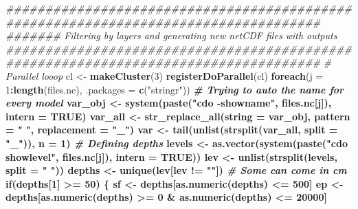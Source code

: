 \documentclass[]{book}
\newenvironment{Shaded}{\begin{snugshade}}{\end{snugshade}}
\newcommand{\CommentTok}[1]{\textcolor[rgb]{0.56,0.35,0.01}{\textit{#1}}}
\newcommand{\ControlFlowTok}[1]{\textcolor[rgb]{0.13,0.29,0.53}{\textbf{#1}}}
\newcommand{\DataTypeTok}[1]{\textcolor[rgb]{0.13,0.29,0.53}{#1}}
\newcommand{\DecValTok}[1]{\textcolor[rgb]{0.00,0.00,0.81}{#1}}
\newcommand{\KeywordTok}[1]{\textcolor[rgb]{0.13,0.29,0.53}{\textbf{#1}}}
\newcommand{\NormalTok}[1]{#1}
\newcommand{\OperatorTok}[1]{\textcolor[rgb]{0.81,0.36,0.00}{\textbf{#1}}}
\newcommand{\OtherTok}[1]{\textcolor[rgb]{0.56,0.35,0.01}{#1}}
\newcommand{\StringTok}[1]{\textcolor[rgb]{0.31,0.60,0.02}{#1}}
\begin{document}
\begin{Shaded}
\begin{Highlighting}[]
{\CommentTok{####################################################################################}
\CommentTok{####### Filtering by layers and generating new netCDF files with outputs}
\CommentTok{#################################################################################### }
  \CommentTok{# Parallel looop}
\NormalTok{    cl <-}\StringTok{ }\KeywordTok{makeCluster}\NormalTok{(}\DecValTok{3}\NormalTok{)}
    \KeywordTok{registerDoParallel}\NormalTok{(cl)}
    \KeywordTok{foreach}\NormalTok{(}\DataTypeTok{j =} \DecValTok{1}\OperatorTok{:}\KeywordTok{length}\NormalTok{(files.nc), }\DataTypeTok{.packages =} \KeywordTok{c}\NormalTok{(}\StringTok{"stringr"}\NormalTok{)) }\OperatorTok{%
      \CommentTok{# Trying to auto the name for every model}
\NormalTok{        var_obj <-}\StringTok{ }\KeywordTok{system}\NormalTok{(}\KeywordTok{paste}\NormalTok{(}\StringTok{"cdo -showname"}\NormalTok{, files.nc[j]), }\DataTypeTok{intern =} \OtherTok{TRUE}\NormalTok{)}
\NormalTok{        var_all <-}\StringTok{ }\KeywordTok{str_replace_all}\NormalTok{(}\DataTypeTok{string =}\NormalTok{ var_obj, }\DataTypeTok{pattern =} \StringTok{" "}\NormalTok{, }\DataTypeTok{replacement =} \StringTok{"_"}\NormalTok{)}
\NormalTok{        var <-}\StringTok{ }\KeywordTok{tail}\NormalTok{(}\KeywordTok{unlist}\NormalTok{(}\KeywordTok{strsplit}\NormalTok{(var_all, }\DataTypeTok{split =} \StringTok{"_"}\NormalTok{)), }\DataTypeTok{n =} \DecValTok{1}\NormalTok{) }
      \CommentTok{# Defining depths}
\NormalTok{        levels <-}\StringTok{ }\KeywordTok{as.vector}\NormalTok{(}\KeywordTok{system}\NormalTok{(}\KeywordTok{paste}\NormalTok{(}\StringTok{"cdo showlevel"}\NormalTok{, files.nc[j]), }\DataTypeTok{intern =} \OtherTok{TRUE}\NormalTok{))}
\NormalTok{        lev <-}\StringTok{ }\KeywordTok{unlist}\NormalTok{(}\KeywordTok{strsplit}\NormalTok{(levels, }\DataTypeTok{split =} \StringTok{" "}\NormalTok{))}
\NormalTok{        depths <-}\StringTok{ }\KeywordTok{unique}\NormalTok{(lev[lev }\OperatorTok{!=}\StringTok{ ""}\NormalTok{])}
      \CommentTok{# Some can come in cm}
        \ControlFlowTok{if}\NormalTok{(depths[}\DecValTok{1}\NormalTok{] }\OperatorTok{>=}\StringTok{ }\DecValTok{50}\NormalTok{) \{ }
\NormalTok{          sf <-}\StringTok{ }\NormalTok{depths[}\KeywordTok{as.numeric}\NormalTok{(depths) }\OperatorTok{<=}\StringTok{ }\DecValTok{500}\NormalTok{]}
\NormalTok{          ep <-}\StringTok{ }\NormalTok{depths[}\KeywordTok{as.numeric}\NormalTok{(depths) }\OperatorTok{>=}\StringTok{ }\DecValTok{0} \OperatorTok{&}\StringTok{ }\KeywordTok{as.numeric}\NormalTok{(depths) }\OperatorTok{<=}\StringTok{ }\DecValTok{20000}\NormalTok{]}
}}
\end{Highlighting}
\end{Shaded}
\end{document}
